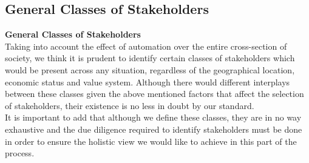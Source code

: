 \subsection{General Classes of Stakeholders}
\label{sec:-general}
\textbf{General Classes of Stakeholders}\\
Taking into account the effect of automation over the entire cross-section of society, we think it is prudent to identify certain classes of stakeholders which would be present across any situation, regardless of the geographical location, economic status and value system. Although there would different interplays between these classes given the above mentioned factors that affect the selection of stakeholders, their existence is no less in doubt by our standard.\\
It is important to add that although we define these classes, they are in no way exhaustive and the due diligence required to identify stakeholders must be done in order to ensure the holistic view we would like to achieve in this part of the process.
